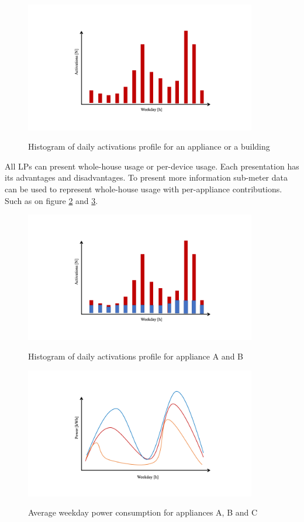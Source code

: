 \begin{figure}[H]
	\centering
	\caption{Histogram of daily activations profile for an appliance or a building}
	\includegraphics[width=0.9\textwidth]{Figures/profile_sketches/Slide5.png}
	\label{fig:daily_act_profile}
\end{figure}

All LPs can present whole-house usage or per-device usage. Each presentation has its advantages and disadvantages. 
To present more information sub-meter data can be used to represent whole-house usage with per-appliance contributions.
Such as on figure \ref{fig:daily_act_m_profile} and \ref{fig:daily_power_m_profile}.

\begin{figure}[H]
	\centering
	\caption{Histogram of daily activations profile for appliance A and B}
	\includegraphics[width=0.9\textwidth]{Figures/profile_sketches/Slide8.png}
	\label{fig:daily_act_m_profile}
\end{figure}
\begin{figure}[H]
	\centering
	\caption{Average weekday power consumption for appliances A, B and C}
	\includegraphics[width=0.9\textwidth]{Figures/profile_sketches/Slide2.png}
	\label{fig:daily_power_m_profile}
\end{figure}

